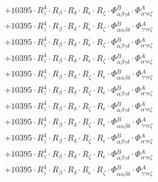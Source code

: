 \documentclass{article}
\begin{document}
\begin{subequations}
\begin{gather}
\begin{array}{c}
 \\[0.2em] 		 + 10395 \cdot R_{z}^{4} \cdot R_{\beta{}} \cdot R_{\delta{}} \cdot R_{\epsilon{}} \cdot R_{\zeta{}} \cdot \Phi{}^{B}_{\alpha{}\beta{}\gamma{}\delta{}} \cdot \Phi{}^{A}_{\alpha{}\gamma{}\epsilon{}\zeta{}} 
 \\[0.2em] 		 + 10395 \cdot R_{z}^{4} \cdot R_{\beta{}} \cdot R_{\delta{}} \cdot R_{\epsilon{}} \cdot R_{\zeta{}} \cdot \Phi{}^{B}_{\alpha{}\alpha{}\beta{}\delta{}} \cdot \Phi{}^{A}_{\gamma{}\gamma{}\epsilon{}\zeta{}} 
 \\[0.2em] 		 + 10395 \cdot R_{z}^{4} \cdot R_{\beta{}} \cdot R_{\delta{}} \cdot R_{\epsilon{}} \cdot R_{\zeta{}} \cdot \Phi{}^{B}_{\alpha{}\beta{}\gamma{}\delta{}} \cdot \Phi{}^{A}_{\alpha{}\gamma{}\epsilon{}\zeta{}} 
 \\[0.2em] 		 + 10395 \cdot R_{z}^{4} \cdot R_{\beta{}} \cdot R_{\delta{}} \cdot R_{\epsilon{}} \cdot R_{\zeta{}} \cdot \Phi{}^{B}_{\alpha{}\beta{}\gamma{}\delta{}} \cdot \Phi{}^{A}_{\alpha{}\gamma{}\epsilon{}\zeta{}} 
 \\[0.2em] 		 + 10395 \cdot R_{z}^{4} \cdot R_{\beta{}} \cdot R_{\delta{}} \cdot R_{\zeta{}} \cdot R_{\epsilon{}} \cdot \Phi{}^{B}_{\alpha{}\alpha{}\beta{}\delta{}} \cdot \Phi{}^{A}_{\gamma{}\gamma{}\epsilon{}\zeta{}} 
 \\[0.2em] 		 + 10395 \cdot R_{z}^{4} \cdot R_{\beta{}} \cdot R_{\delta{}} \cdot R_{\zeta{}} \cdot R_{\epsilon{}} \cdot \Phi{}^{B}_{\alpha{}\beta{}\gamma{}\delta{}} \cdot \Phi{}^{A}_{\alpha{}\gamma{}\epsilon{}\zeta{}} 
 \\[0.2em] 		 + 10395 \cdot R_{z}^{4} \cdot R_{\beta{}} \cdot R_{\delta{}} \cdot R_{\zeta{}} \cdot R_{\epsilon{}} \cdot \Phi{}^{B}_{\alpha{}\beta{}\gamma{}\delta{}} \cdot \Phi{}^{A}_{\alpha{}\gamma{}\epsilon{}\zeta{}} 
 \\[0.2em] 		 + 10395 \cdot R_{z}^{4} \cdot R_{\beta{}} \cdot R_{\delta{}} \cdot R_{\zeta{}} \cdot R_{\epsilon{}} \cdot \Phi{}^{B}_{\alpha{}\alpha{}\beta{}\delta{}} \cdot \Phi{}^{A}_{\gamma{}\gamma{}\epsilon{}\zeta{}} 
 \\[0.2em] 		 + 10395 \cdot R_{z}^{4} \cdot R_{\beta{}} \cdot R_{\delta{}} \cdot R_{\zeta{}} \cdot R_{\epsilon{}} \cdot \Phi{}^{B}_{\alpha{}\beta{}\gamma{}\delta{}} \cdot \Phi{}^{A}_{\alpha{}\gamma{}\epsilon{}\zeta{}} 
 \\[0.2em] 		 + 10395 \cdot R_{z}^{4} \cdot R_{\beta{}} \cdot R_{\delta{}} \cdot R_{\zeta{}} \cdot R_{\epsilon{}} \cdot \Phi{}^{B}_{\alpha{}\beta{}\gamma{}\delta{}} \cdot \Phi{}^{A}_{\alpha{}\gamma{}\epsilon{}\zeta{}} 
 \\[0.2em] 		 + 10395 \cdot R_{z}^{4} \cdot R_{\beta{}} \cdot R_{\delta{}} \cdot R_{\epsilon{}} \cdot R_{\zeta{}} \cdot \Phi{}^{B}_{\alpha{}\alpha{}\beta{}\delta{}} \cdot \Phi{}^{A}_{\gamma{}\gamma{}\epsilon{}\zeta{}} 

\end{array}
\end{gather}
\end{subequations}
\end{document}
